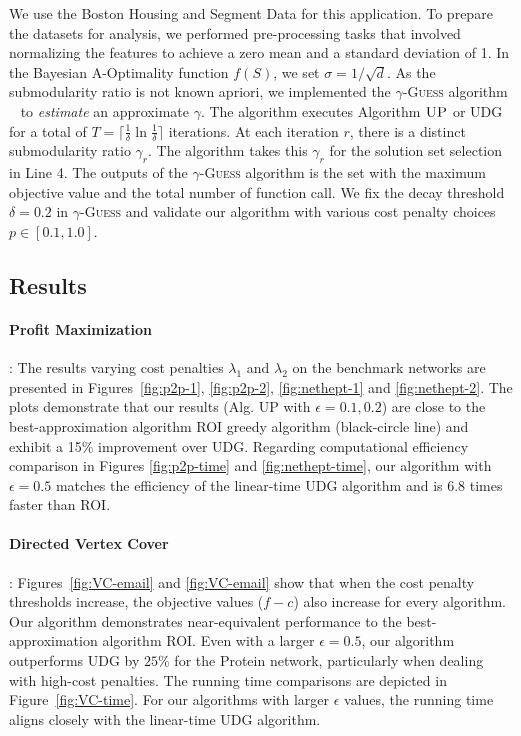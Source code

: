 \documentclass[10pt]{article} %
\theoremstyle{remark}
\begin{document}
We use the Boston Housing \cite{harrison1978hedonic} and Segment Data \cite{qian2021multiobjective} for this application. To prepare the datasets for analysis, we performed pre-processing tasks that involved normalizing the features to achieve a zero mean and a standard deviation of 1. In the Bayesian A-Optimality function $f(S)$, we set $\sigma=1/\sqrt{d}$.
As the submodularity ratio is not known apriori, we implemented the $\gamma$-\textsc{Guess} algorithm ~\cite{harshaw2019submodular} to \emph{estimate} an approximate $\gamma$. 
The algorithm executes Algorithm $\textsc{UP}$ or UDG for a total of $T=\lceil \frac{1}{\delta}\ln \frac{1}{\delta} \rceil$ iterations. At each iteration $r$, there is a distinct submodularity ratio $\gamma_r$. The algorithm takes this $\gamma_r$ for the solution set selection in Line 4. The outputs of the $\gamma$-\textsc{Guess} algorithm is the set with the maximum objective value and the total number of function call.
We fix the decay threshold $\delta=0.2$ in $\gamma$-\textsc{Guess} and validate our algorithm with various cost penalty choices $p\in[0.1,1.0]$. 


\subsection{Results}

\paragraph{\bf Profit Maximization}: The results varying cost penalties $\lambda_1$ and $\lambda_2$ on the benchmark networks are presented in Figures~\ref{fig:p2p-1}, \ref{fig:p2p-2}, \ref{fig:nethept-1} and \ref{fig:nethept-2}. 
The plots demonstrate that our results (Alg. UP with $\epsilon=0.1,0.2$) are close to the best-approximation algorithm ROI greedy algorithm (black-circle line) and exhibit a 15\% improvement over UDG. Regarding computational efficiency comparison in Figures \ref{fig:p2p-time} and \ref{fig:nethept-time}, our algorithm with $\epsilon=0.5$ matches the efficiency of the linear-time UDG algorithm and is 6.8 times faster than ROI. 

\paragraph{\bf Directed Vertex Cover}: Figures~\ref{fig:VC-email} and \ref{fig:VC-email} show that when the cost penalty thresholds increase, the objective values ($f-c$) also increase for every algorithm. Our algorithm demonstrates near-equivalent performance to the best-approximation algorithm \textsc{ROI}. Even with a larger $\epsilon=0.5$, our algorithm outperforms \textsc{UDG} by $25\%$ for the Protein network, particularly when dealing with high-cost penalties. The running time comparisons are depicted in Figure~\ref{fig:VC-time}.
For our algorithms with larger $\epsilon$ values, the running time aligns closely with the linear-time UDG algorithm. 
\end{document}
